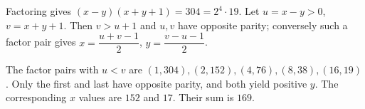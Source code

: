 Factoring gives $(x-y)(x+y+1)=304=2^4\cdot19$. Let $u=x-y>0$, $v=x+y+1$. Then $v>u+1$ and $u,v$ have opposite parity; conversely such a factor pair gives $x=\dfrac{u+v-1}{2}$, $y=\dfrac{v-u-1}{2}$.

The factor pairs with $u<v$ are $(1,304),(2,152),(4,76),(8,38),(16,19)$. Only the first and last have opposite parity, and both yield positive $y$. The corresponding $x$ values are $152$ and $17$. Their sum is $\boxed{169}$.
